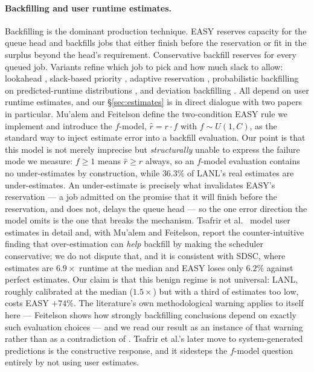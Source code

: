 \documentclass[11pt,twocolumn]{article}
\begin{document}
\paragraph{Backfilling and user runtime estimates.}
Backfilling \cite{SLURM2003} is the dominant production technique. EASY
\cite{Mualem2001} reserves capacity for the queue head and backfills jobs that
either finish before the reservation or fit in the surplus beyond the head's
requirement. Conservative backfill reserves for every queued job. Variants
refine which job to pick and how much slack to allow: lookahead
\cite{Shmueli2003}, slack-based priority \cite{Talby1999}, adaptive reservation
\cite{Shmueli2005}, probabilistic backfilling on predicted-runtime
distributions \cite{Nissimov2007}, and deviation backfilling \cite{Hai2023}.
All depend on user runtime estimates, and our \S\ref{sec:estimates} is in direct
dialogue with two papers in particular. Mu'alem and Feitelson \cite{Mualem2001}
define the two-condition EASY rule we implement and introduce the $f$-model,
$\hat r = r\cdot f$ with $f\sim U(1,C)$, as the standard way to inject estimate
error into a backfill evaluation. Our point is that this model is not merely
imprecise but \emph{structurally} unable to express the failure mode we measure:
$f \ge 1$ means $\hat r \ge r$ always, so an $f$-model evaluation contains no
under-estimates by construction, while $36.3\%$ of LANL's real estimates are
under-estimates. An under-estimate is precisely what invalidates EASY's
reservation --- a job admitted on the promise that it will finish before the
reservation, and does not, delays the queue head --- so the one error direction
the model omits is the one that breaks the mechanism. Tsafrir et al.\
\cite{Tsafrir2005} model user estimates in detail and, with Mu'alem and
Feitelson, report the counter-intuitive finding that over-estimation can
\emph{help} backfill by making the scheduler conservative; we do not dispute
that, and it is consistent with SDSC, where estimates are $6.9\times$ runtime at
the median and EASY loses only $6.2\%$ against perfect estimates. Our claim is
that this benign regime is not universal: LANL, roughly calibrated at the median
($1.5\times$) but with a third of estimates too low, costs EASY $+74\%$. The
literature's own methodological warning applies to itself here --- Feitelson
\cite{Feitelson2005} shows how strongly backfilling conclusions depend on
exactly such evaluation choices --- and we read our result as an instance of
that warning rather than as a contradiction of \cite{Mualem2001, Tsafrir2005}.
Tsafrir et al.'s later move to system-generated predictions \cite{Tsafrir2007}
is the constructive response, and it sidesteps the $f$-model question entirely
by not using user estimates.
\end{document}
